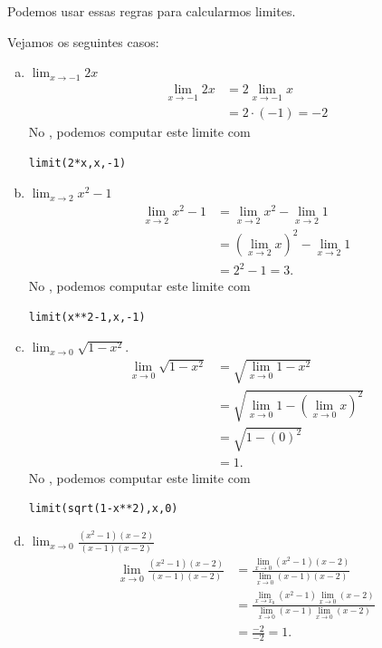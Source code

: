 Podemos usar essas regras para calcularmos limites.

\begin{ex}
  Vejamos os seguintes casos:
  \begin{enumerate}[a)]
  \item $\displaystyle \lim_{x\to -1} 2x$
  \begin{align}
    \lim_{x\to -1} 2x &= 2\lim_{x\to -1} x\\
    &= 2\cdot(-1) = -2
  \end{align}
  \ifispython
  No \sympy, podemos computar este limite com
\begin{verbatim}
limit(2*x,x,-1)
\end{verbatim}
  \fi
\item $\displaystyle \lim_{x\to 2} x^2 - 1$
  \begin{align}
    \lim_{x\to 2} x^2 - 1 &= \lim_{x\to 2} x^2 - \lim_{x\to 2} 1\\
                          &= \left(\lim_{x\to 2} x\right)^2 - \lim_{x\to 2} 1\\
    &= 2^2 - 1 = 3.
  \end{align}
  \ifispython
  No \sympy, podemos computar este limite com
\begin{verbatim}
limit(x**2-1,x,-1)
\end{verbatim}
  \fi
\item $\displaystyle \lim_{x\to 0} \sqrt{1-x^2}$.
  \begin{align}
    \lim_{x\to 0} \sqrt{1-x^2} &= \sqrt{\lim_{x\to 0} 1-x^2}\\
                                &= \sqrt{\lim_{x\to 0} 1 - \left(\lim_{x\to 0} x\right)^2}\\
                                &= \sqrt{1 - (0)^2} \\
                                &= 1.
  \end{align}
  \ifispython
  No \sympy, podemos computar este limite com
\begin{verbatim}
limit(sqrt(1-x**2),x,0)
\end{verbatim}
  \fi  
\item $\displaystyle \lim_{x\to 0} \frac{(x^2-1)(x-2)}{(x-1)(x-2)}$
  \begin{align}
    \lim_{x\to 0} \frac{(x^2-1)(x-2)}{(x-1)(x-2)} &= \frac{\lim_{x\to 0}(x^2-1)(x-2)}{\lim_{x\to 0} (x-1)(x-2)}\\
                                                  &= \frac{\lim_{x\to x_0} (x^2-1)\lim_{x\to 0}(x-2)}{\lim_{x\to 0}(x-1)\lim_{x\to 0}(x-2)}\\
    &= \frac{-2}{-2} = 1.
  \end{align}
  \end{enumerate}
\end{ex}

